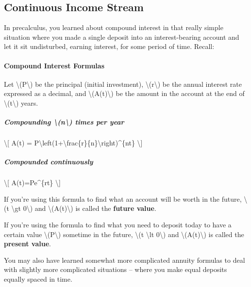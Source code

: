 \hypertarget{continuous-income-stream}{%
\subsection{Continuous Income Stream}\label{continuous-income-stream}}

In precalculus, you learned about compound interest in that really
simple situation where you made a single deposit into an
interest-bearing account and let it sit undisturbed, earning interest,
for some period of time. Recall:

\hypertarget{compound-interest-formulas}{%
\paragraph{Compound Interest
Formulas}\label{compound-interest-formulas}}

Let \textbackslash{}(P\textbackslash{}) be the principal (initial
investment), \textbackslash{}(r\textbackslash{}) be the annual interest
rate expressed as a decimal, and \textbackslash{}(A(t)\textbackslash{})
be the amount in the account at the end of
\textbackslash{}(t\textbackslash{}) years.

\hypertarget{compounding-n-times-per-year}{%
\subparagraph{Compounding \textbackslash{}(n\textbackslash{}) times per
year}\label{compounding-n-times-per-year}}

\textbackslash{}{[} A(t) =
P\textbackslash{}left(1+\textbackslash{}frac\{r\}\{n\}\textbackslash{}right)\^{}\{nt\}
\textbackslash{}{]}

\hypertarget{compounded-continuously}{%
\subparagraph{Compounded continuously}\label{compounded-continuously}}

\textbackslash{}{[} A(t)=Pe\^{}\{rt\} \textbackslash{}{]}

If you're using this formula to find what an account will be worth in
the future, \textbackslash{}(t \textbackslash{}gt 0\textbackslash{}) and
\textbackslash{}(A(t)\textbackslash{}) is called the \textbf{future
value}.

If you're using the formula to find what you need to deposit today to
have a certain value \textbackslash{}(P\textbackslash{}) sometime in the
future, \textbackslash{}(t \textbackslash{}lt 0\textbackslash{}) and
\textbackslash{}(A(t)\textbackslash{}) is called the \textbf{present
value}.

You may also have learned somewhat more complicated annuity formulas to
deal with slightly more complicated situations -- where you make equal
deposits equally spaced in time.


